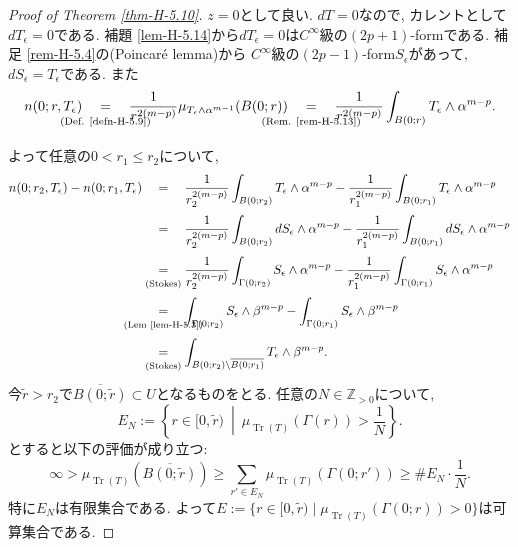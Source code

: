 \begin{proof}[Proof of Theorem \ref{thm-H-5.10}]
$z=0$として良い. 
$dT=0$なので, カレントとして$dT_\epsilon=0$である. 
補題 \ref{lem-H-5.14}から$dT_\epsilon=0$は$C^\infty$級の$(2p+1)$-formである. 
補足 \ref{rem-H-5.4}の(Poincaré lemma)から
$C^\infty$級の$(2p-1)$-form$S_\epsilon$があって, $dS_\epsilon=T_\epsilon$である. 
また
\begin{equation*}
n(0;r,T_\epsilon)
\underalign{\text{(Def. \ref{defn-H-5.9})}}{=}
\frac{1}{r^{2(m-p)}}
\mu_{T_\epsilon\wedge\alpha^{m-1}}(B(0;r))
\underalign{\text{(Rem. \ref{rem-H-5.13})}}{=}
\frac{1}{r^{2(m-p)}}
\int_{B(0;r)}
T_\epsilon\wedge\alpha^{m-p}.
\end{equation*}

よって任意の$0< r_1\leq r_2$について, 
\begin{align*}
n(0;r_2,T_\epsilon)-n(0;r_1,T_\epsilon)
&\underalign{\text{}}{=}
\frac{1}{r_2^{2(m-p)}}
\int_{B(0;r_2)}
T_\epsilon\wedge\alpha^{m-p}
-
\frac{1}{r_1^{2(m-p)}}
\int_{B(0;r_1)}
T_\epsilon\wedge\alpha^{m-p}\\
&\underalign{\text{}}{=}
\frac{1}{r_2^{2(m-p)}}
\int_{B(0;r_2)}
dS_\epsilon\wedge\alpha^{m-p}
-
\frac{1}{r_1^{2(m-p)}}
\int_{B(0;r_1)}
dS_\epsilon\wedge\alpha^{m-p}\\
&\underalign{\text{(Stokes)}}{=}
\frac{1}{r_2^{2(m-p)}}
\int_{\Gamma(0;r_2)}
S_\epsilon\wedge\alpha^{m-p}
-
\frac{1}{r_1^{2(m-p)}}
\int_{\Gamma(0;r_1)}
S_\epsilon\wedge\alpha^{m-p}\\
&\underalign{\text{(Lem \ref{lem-H-5.3})}}{=}
\int_{\Gamma(0;r_2)}
S_\epsilon\wedge\beta^{m-p}
-
\int_{\Gamma(0;r_1)}
S_\epsilon\wedge\beta^{m-p}\\
&\underalign{\text{(Stokes)}}{=}
\int_{B(0;r_2)\setminus\overline{B(0;r_1)}}
T_\epsilon\wedge\beta^{m-p}.
\end{align*}
今$\widetilde r>r_2$で$\overline{B(0;\widetilde r)}\subset U$となるものをとる. 
任意の$N\in\mathbb{Z}_{>0}$について, 
\begin{equation*}
E_N:=
\left\{
r\in[0,\widetilde r)
\ \middle|\
\mu_{\operatorname{Tr}(T)}(\Gamma(r))>\frac{1}{N}
\right\}.
\end{equation*}
とすると以下の評価が成り立つ: 
\begin{equation*}
\infty
>
\mu_{\operatorname{Tr}(T)}
\left(
\overline{B(0;\widetilde r)}
\right)
\geq
\sum_{r'\in E_N}
\mu_{\operatorname{Tr}(T)}(\Gamma(0;r'))
\geq
\#E_N\cdot\frac{1}{N}.
\end{equation*}
特に$E_N$は有限集合である.
よって$E:=\{r\in[0,\widetilde r) \mid \mu_{\operatorname{Tr}(T)}(\Gamma(0;r))>0\}$は可算集合である. 

\end{proof}
